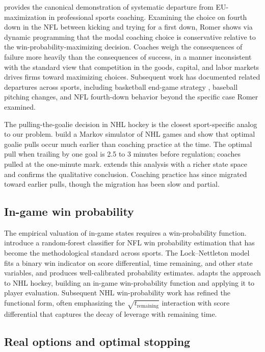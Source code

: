 \documentclass[11pt]{article}
\begin{document}
\citet{Romer2006} provides the canonical demonstration of systematic departure from EU-maximization in professional sports coaching. Examining the choice on fourth down in the NFL between kicking and trying for a first down, Romer shows via dynamic programming that the modal coaching choice is conservative relative to the win-probability-maximizing decision. Coaches weigh the consequences of failure more heavily than the consequences of success, in a manner inconsistent with the standard view that competition in the goods, capital, and labor markets drives firms toward maximizing choices. Subsequent work has documented related departures across sports, including basketball end-game strategy \citep{Annis2006, Skinner2012}, baseball pitching changes, and NFL fourth-down behavior beyond the specific case Romer examined.

The pulling-the-goalie decision in NHL hockey is the closest sport-specific analog to our problem. \citet{BeaudoinSwartz2010} build a Markov simulator of NHL games and show that optimal goalie pulls occur much earlier than coaching practice at the time. The optimal pull when trailing by one goal is 2.5 to 3 minutes before regulation; coaches pulled at the one-minute mark. \citet{Asmussen2011} extends this analysis with a richer state space and confirms the qualitative conclusion. Coaching practice has since migrated toward earlier pulls, though the migration has been slow and partial.

\subsection{In-game win probability}

The empirical valuation of in-game states requires a win-probability function. \citet{LockNettleton2014} introduce a random-forest classifier for NFL win probability estimation that has become the methodological standard across sports. The Lock--Nettleton model fits a binary win indicator on score differential, time remaining, and other state variables, and produces well-calibrated probability estimates. \citet{Pettigrew2014} adapts the approach to NHL hockey, building an in-game win-probability function and applying it to player evaluation. Subsequent NHL win-probability work \citep[e.g.][]{Buttrey2015, Schuckers2017} has refined the functional form, often emphasizing the $\sqrt{t_{\text{remaining}}}$ interaction with score differential that captures the decay of leverage with remaining time.

\subsection{Real options and optimal stopping}
\end{document}
